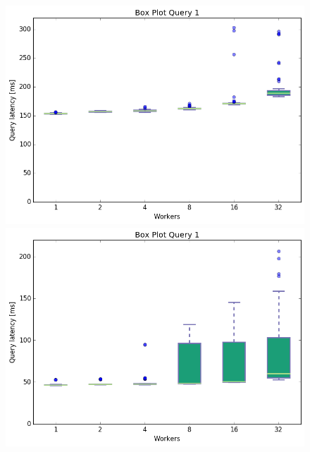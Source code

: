 \documentclass[11pt,singlecolumn]{scrartcl}
\begin{document}
\begin{figure}[!tbp]
  \centering
  \RawFloats
  \begin{minipage}[b]{0.5\textwidth}
    \includegraphics[width=\textwidth]{boxesfl/q1}
  \end{minipage}
  \hfill
  \begin{minipage}[b]{0.5\textwidth}
    \includegraphics[width=\textwidth]{boxesfs/q1}
  \end{minipage}
\end{figure}
\end{document}
